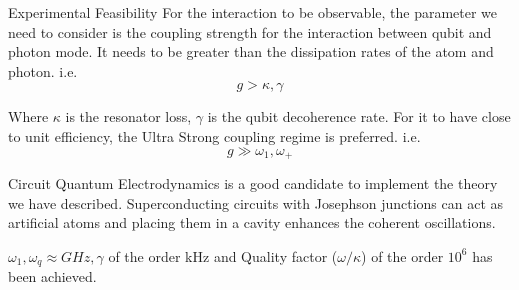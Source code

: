 \documentclass[pdf,9pt]{beamer}
\begin{document}
    \begin{frame}{Experimental Feasibility}
        For the interaction to be observable, the parameter we need to consider is the coupling strength for the interaction between qubit and photon mode. It needs to be greater than the dissipation rates of the atom and photon. i.e. $$g> \kappa, \gamma$$
        
        Where $\kappa$  is the resonator loss, $\gamma$ is the qubit decoherence rate.
        For it to have close to unit efficiency, the Ultra Strong coupling regime is preferred. i.e. $$g\gg \omega_{1}, \omega_{+}$$
        
        Circuit Quantum Electrodynamics is a good candidate to implement the theory we have described. Superconducting circuits with Josephson junctions can act as artificial atoms and placing them in a  cavity enhances the coherent oscillations.
        
        $\omega_{1}, \omega_{q} \approx GHz, \gamma $ of the order kHz and Quality factor ($\omega/\kappa$) of the order $10^{6}$ has been achieved. 
        
    \end{frame}
\end{document}
